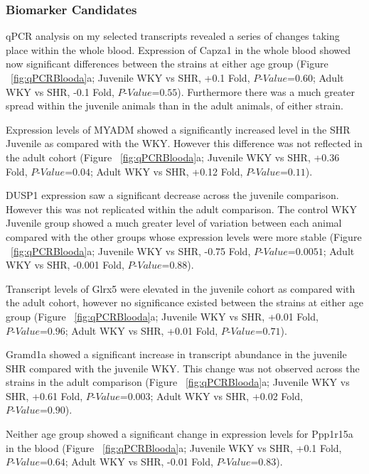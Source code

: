 \subsubsection{Biomarker Candidates} \label{candidatesqpcr}

qPCR analysis on my selected transcripts revealed a series of changes taking place within the whole blood. Expression of Capza1 in the whole blood showed now significant differences between the strains at either age group (Figure ~\ref{fig:qPCRBlooda}a; Juvenile WKY vs SHR, +0.1 Fold, $\textit{P-Value=0.60}$; Adult WKY vs SHR, -0.1 Fold, $\textit{P-Value=0.55}$). Furthermore there was a much greater spread within the juvenile animals than in the adult animals, of either strain. 

Expression levels of MYADM showed a significantly increased level in the SHR Juvenile as compared with the WKY. However this difference was not reflected in the adult cohort (Figure ~\ref{fig:qPCRBlooda}a; Juvenile WKY vs SHR, +0.36 Fold, $\textit{P-Value=0.04}$; Adult WKY vs SHR, +0.12 Fold, $\textit{P-Value=0.11}$).

DUSP1 expression saw a significant decrease across the juvenile comparison. However this was not replicated within the adult comparison. The control WKY Juvenile group showed a much greater level of variation between each animal compared with the other groups whose expression levels were more stable (Figure ~\ref{fig:qPCRBlooda}a; Juvenile WKY vs SHR, -0.75 Fold, $\textit{P-Value=0.0051}$; Adult WKY vs SHR, -0.001 Fold, $\textit{P-Value=0.88}$). 

Transcript levels of Glrx5 were elevated in the juvenile cohort as compared with the adult cohort, however no significance existed between the strains at either age group (Figure ~\ref{fig:qPCRBlooda}a; Juvenile WKY vs SHR, +0.01 Fold, $\textit{P-Value=0.96}$; Adult WKY vs SHR, +0.01 Fold, $\textit{P-Value=0.71}$). 

Gramd1a showed a significant increase in transcript abundance in the juvenile SHR compared with the juvenile WKY. This change was not observed across the strains in the adult comparison (Figure ~\ref{fig:qPCRBlooda}a; Juvenile WKY vs SHR, +0.61 Fold, $\textit{P-Value=0.003}$; Adult WKY vs SHR, +0.02 Fold, $\textit{P-Value=0.90}$). 

Neither age group showed a significant change in expression levels for Ppp1r15a in the blood (Figure ~\ref{fig:qPCRBlooda}a; Juvenile WKY vs SHR, +0.1 Fold, $\textit{P-Value=0.64}$; Adult WKY vs SHR, -0.01 Fold, $\textit{P-Value=0.83}$). 

